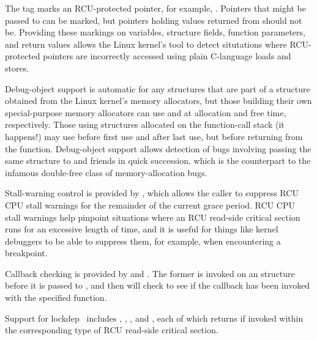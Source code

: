 The  tag marks an RCU-protected pointer, for example,
.
Pointers that might be passed to  can be marked,
but pointers holding values returned from 
should not be.
Providing these markings on variables, structure fields, function
parameters, and return values allows the Linux kernel's 
tool to detect situtations where RCU-protected pointers are
incorrectly accessed using plain C-language loads and stores.

Debug-object support is automatic for any  structures
that are part of a structure obtained from the Linux kernel's
memory allocators, but those building their own special-purpose
memory allocators can use  and 
at allocation and free time, respectively.
Those using  structures allocated on the function-call
stack (it happens!\@) may use 
before first use and  after last use,
but before returning from the function.
Debug-object support allows detection of bugs involving passing the
same  structure to  and friends in
quick succession, which is the  counterpart to the
infamous double-free class of memory-allocation bugs.

Stall-warning control is provided by , which
allows the caller to suppress RCU CPU stall warnings for the remainder
of the current grace period.
RCU CPU stall warnings help pinpoint situations where an RCU read-side
critical section runs for an excessive length of time, and it is useful
for things like kernel debuggers to be able to suppress them, for example,
when encountering a breakpoint.

Callback checking is provided by  and
.
The former is invoked on an  structure before it is passed
to , and then  will
check to see if the callback has been invoked with the specified
function.

Support for lockdep~\cite{JonathanCorbet2006lockdep} includes
,
,
, and
,
each of which returns  if invoked within the corresponding
type of RCU read-side critical section.

\QuickQuizEnd

